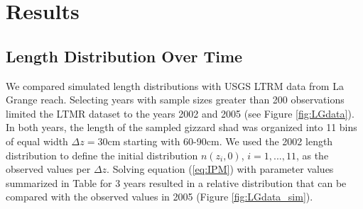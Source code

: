 \documentclass[11pt,oneside]{amsart}
\def\ds{\displaystyle}
\theoremstyle{definition}
\begin{document}


\section{Results}

\subsection{Length Distribution Over Time} 
We compared simulated length distributions with USGS LTRM data from La Grange reach. Selecting years with sample sizes greater than 200 observations limited the LTMR dataset to the years 2002 and 2005 (see Figure \ref{fig:LGdata}). In both years, the length of the sampled gizzard shad was organized into 11 bins of equal width $\Delta z = 30\mbox{cm}$ starting with 60-90cm.  We used the 2002 length distribution to define the initial distribution $\ds n(z_i,0)$, $i=1,...,11$, as the observed values per $\Delta z$. Solving equation (\ref{eq:IPM}) with parameter values summarized in Table \label{table:parameters} for 3 years resulted in a relative distribution that can be compared with the observed values in 2005 (Figure \ref{fig:LGdata_sim}).
\end{document}

